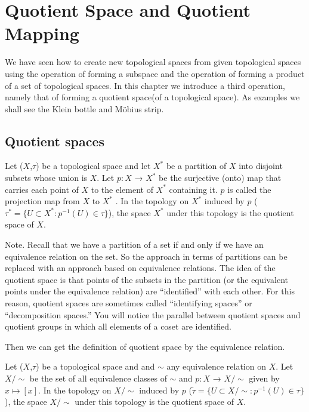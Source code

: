 \chapter{Quotient Space and Quotient Mapping}\label{chp:3_2}


We have seen how to create new topological spaces from given topological spaces
using the operation of forming a subspace and the operation of forming a product of a set of topological spaces.
In this chapter we introduce a third operation, namely that of forming a quotient space(of a topological space).
As examples we shall see the Klein bottle and M\"obius strip.

\section{Quotient spaces}

\begin{definition}{}{}
    Let ($X$,$\tau$) be a topological space and let $X^*$ be a partition of $X$ into
    disjoint subsets whose union is $X$. Let $p:X$ → $X^*$ be the surjective (onto) map
    that carries each point of $X$ to the element of $X^*$
    containing it. $p$ is called the
    projection map from $X$ to $X^*$
    . In the topology on $X^*$
    induced by $p$ ($\tau^*=\{U\subset X^*: p^{-1}(U)\in\tau\}$), the space $X^*$ under this topology is the quotient space of $X$.
\end{definition}

Note. Recall that we have a partition of a set if and only if we have an equivalence
relation on the set. So the approach in terms
of partitions can be replaced with an approach based on equivalence relations.
The idea of the quotient space is that points of the subsets in the partition (or
the equivalent points under the equivalence relation) are “identified” with each
other. For this reason, quotient spaces are sometimes called “identifying spaces” or
“decomposition spaces.” You will notice the parallel between quotient spaces and
quotient groups in which all elements of a coset are identified.

Then we can get the definition of quotient space by the equivalence relation.

\begin{definition}{}{}
    Let ($X$,$\tau$) be a topological space and and $\sim$ any equivalence relation on $X$.
    Let $X/\sim$ be the set of all equivalence classes of $\sim$ and $p:X$ → $X/\sim$ given by $x\mapsto [x]$. 
    In the topology on $X/\sim$
    induced by $p$ ($\tilde{\tau}=\{U\subset X/\sim: p^{-1}(U)\in\tau\}$), the space $X/\sim$ under this topology is the quotient space of $X$.
\end{definition}

